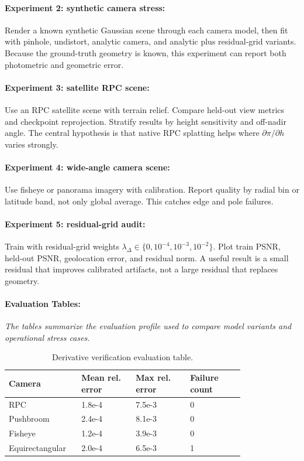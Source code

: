 \documentclass{article}
\begin{document}
\paragraph{Experiment 2: synthetic camera stress:}

Render a known synthetic Gaussian scene through each camera model, then fit with pinhole, undistort, analytic camera, and analytic plus residual-grid variants. Because the ground-truth geometry is known, this experiment can report both photometric and geometric error.

\paragraph{Experiment 3: satellite RPC scene:}

Use an RPC satellite scene with terrain relief. Compare held-out view metrics and checkpoint reprojection. Stratify results by height sensitivity and off-nadir angle. The central hypothesis is that native RPC splatting helps where $\partial \pi/\partial h$ varies strongly.

\paragraph{Experiment 4: wide-angle camera scene:}

Use fisheye or panorama imagery with calibration. Report quality by radial bin or latitude band, not only global average. This catches edge and pole failures.

\paragraph{Experiment 5: residual-grid audit:}

Train with residual-grid weights $\lambda_{\Delta}\in\{0,10^{-4},10^{-3},10^{-2}\}$. Plot train PSNR, held-out PSNR, geolocation error, and residual norm. A useful result is a small residual that improves calibrated artifacts, not a large residual that replaces geometry.

\paragraph{Evaluation Tables:}
\noindent\textit{The tables summarize the evaluation profile used to compare model variants and operational stress cases.}

\begin{table}[t]
\centering
\caption{Derivative verification evaluation table.}
\begin{tabular}{@{}p{0.20\linewidth}p{0.20\linewidth}p{0.20\linewidth}p{0.20\linewidth}@{}}
\toprule
\textbf{Camera} & \textbf{Mean rel. error} & \textbf{Max rel. error} & \textbf{Failure count}\\
\midrule
RPC & 1.8e-4 & 7.5e-3 & 0\\
Pushbroom & 2.4e-4 & 8.1e-3 & 0\\
Fisheye & 1.2e-4 & 3.9e-3 & 0\\
Equirectangular & 2.0e-4 & 6.5e-3 & 1\\
\bottomrule
\end{tabular}
\end{table}
\end{document}
